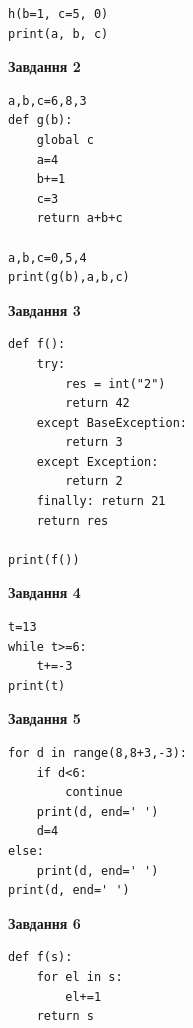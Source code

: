 \documentclass[12pt, ukrainian]{article}
\begin{document}
{{{{{{{{\begin{minipage}[t]{7.5cm}
\begin{verbatim}
h(b=1, c=5, 0)
print(a, b, c)
\end{verbatim}



\begin{center}
\textbf{Завдання 2}
\end{center}

\begin{verbatim}
a,b,c=6,8,3
def g(b):
    global c
    a=4
    b+=1
    c=3
    return a+b+c

a,b,c=0,5,4
print(g(b),a,b,c)
\end{verbatim}



\begin{center}
\textbf{Завдання 3}
\end{center}

\begin{verbatim}
def f():
    try:
        res = int("2")
        return 42
    except BaseException: 
        return 3
    except Exception: 
        return 2
    finally: return 21
    return res

print(f())
\end{verbatim}



\begin{center}
\textbf{Завдання 4}
\end{center}

\begin{verbatim}
t=13
while t>=6:
    t+=-3
print(t)
\end{verbatim}

\end{minipage}
\vline \hspace{6mm}
\begin{minipage}[t]{10.5cm}

\begin{center}
\textbf{Завдання 5}
\end{center}

\begin{verbatim}
for d in range(8,8+3,-3):
    if d<6:
        continue
    print(d, end=' ')
    d=4
else:
    print(d, end=' ')
print(d, end=' ')
\end{verbatim}



\begin{center}
\textbf{Завдання 6}
\end{center}

\begin{verbatim}
def f(s):
    for el in s:
        el+=1
    return s


\end{verbatim}
\end{minipage}}}}}}}}}
\end{document}
